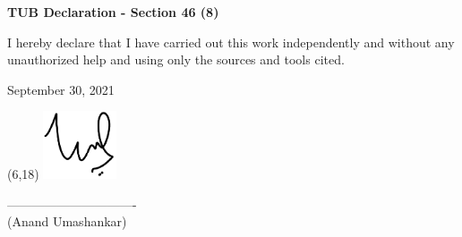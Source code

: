 
{\LARGE \textbf{TUB Declaration - Section 46 (8)}}

\vspace*{\fill}

I hereby declare that I have carried out this work independently and without any unauthorized help and using only the sources and tools cited.

\vspace*{\fill}

September 30, 2021

\vspace*{\fill}
\begin{textblock}{10}(6,18)
\raggedleft\noindent\includegraphics[height=2cm]{images/sign.pdf}
\end{textblock}
\begin{flushright}
------------------------------- \\
(Anand Umashankar)
\end{flushright}
\vspace*{\fill}
\newpage